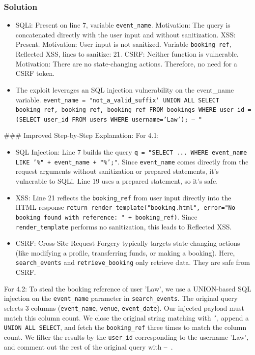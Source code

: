 \documentclass{article}
\begin{document}
\subsubsection*{Solution}
\begin{itemize}
    \item[\textbf{4.1}] SQLi: Present on line 7, variable \texttt{event\_name}. Motivation: The query is concatenated directly with the user input and without sanitization. XSS: Present. Motivation: User input is not sanitized. Variable \texttt{booking\_ref}, Reflected XSS, lines to sanitize: 21. CSRF: Neither function is vulnerable. Motivation: There are no state-changing actions. Therefore, no need for a CSRF token.

    \item[\textbf{4.2}] The exploit leverages an SQL injection vulnerability on the event\_name variable. \texttt{event\_name = "not\_a\_valid\_suffix' UNION ALL SELECT booking\_ref, booking\_ref, booking\_ref FROM bookings WHERE user\_id = (SELECT user\_id FROM users WHERE username='Law'); -- "}

\end{itemize}
\#\#\# Improved Step-by-Step Explanation:
For 4.1:
\begin{itemize}
    \item SQL Injection: Line 7 builds the query \texttt{q = "SELECT ... WHERE event\_name LIKE '\%" + event\_name + "\%';"}. Since \texttt{event\_name} comes directly from the request arguments without sanitization or prepared statements, it's vulnerable to SQLi. Line 19 uses a prepared statement, so it's safe.
    \item XSS: Line 21 reflects the \texttt{booking\_ref} from user input directly into the HTML response \texttt{return render\_template("booking.html", error="No booking found with reference: " + booking\_ref)}. Since \texttt{render\_template} performs no sanitization, this leads to Reflected XSS.
    \item CSRF: Cross-Site Request Forgery typically targets state-changing actions (like modifying a profile, transferring funds, or making a booking). Here, \texttt{search\_events} and \texttt{retrieve\_booking} only retrieve data. They are safe from CSRF.
\end{itemize}
For 4.2: To steal the booking reference of user 'Law', we use a UNION-based SQL injection on the \texttt{event\_name} parameter in \texttt{search\_events}. The original query selects 3 columns (\texttt{event\_name}, \texttt{venue}, \texttt{event\_date}). Our injected payload must match this column count. We close the original string matching with \texttt{'}, append a \texttt{UNION ALL SELECT}, and fetch the \texttt{booking\_ref} three times to match the column count. We filter the results by the \texttt{user\_id} corresponding to the username 'Law', and comment out the rest of the original query with \texttt{-- }.
\end{document}
